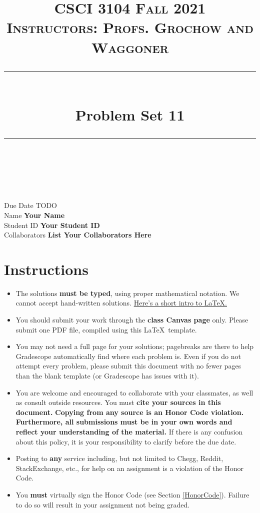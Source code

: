 \documentclass[11pt]{article}
\title{
\normalfont \normalsize 
\textsc{CSCI 3104 Fall 2021 \\ 
Instructors: Profs. Grochow and Waggoner} \\
[10pt] 
\rule{\linewidth}{0.5pt} \\[6pt] 
\huge Problem Set 11 \\
\rule{\linewidth}{2pt}  \\[10pt]
}
\date{}
\theoremstyle{definition}
\theoremstyle{definition}
\theoremstyle{definition}
\begin{document}
\maketitle


\noindent
Due Date \dotfill TODO \\
Name \dotfill \textbf{Your Name} \\
Student ID \dotfill \textbf{Your Student ID} \\
Collaborators \dotfill \textbf{List Your Collaborators Here}

\tableofcontents

\section{Instructions}
 \begin{itemize}
	\item The solutions \textbf{must be typed}, using proper mathematical notation. We cannot accept hand-written solutions. \href{http://ece.uprm.edu/~caceros/latex/introduction.pdf}{Here's a short intro to \LaTeX.}
	\item You should submit your work through the \textbf{class Canvas page} only. Please submit one PDF file, compiled using this \LaTeX \ template.
	\item You may not need a full page for your solutions; pagebreaks are there to help Gradescope automatically find where each problem is. Even if you do not attempt every problem, please submit this document with no fewer pages than the blank template (or Gradescope has issues with it).

	\item You are welcome and encouraged to collaborate with your classmates, as well as consult outside resources. You must \textbf{cite your sources in this document.} \textbf{Copying from any source is an Honor Code violation. Furthermore, all submissions must be in your own words and reflect your understanding of the material.} If there is any confusion about this policy, it is your responsibility to clarify before the due date. 

	\item Posting to \textbf{any} service including, but not limited to Chegg, Reddit, StackExchange, etc., for help on an assignment is a violation of the Honor Code.

	\item You \textbf{must} virtually sign the Honor Code (see Section \ref{HonorCode}). Failure to do so will result in your assignment not being graded.
\end{itemize}
\end{document}
